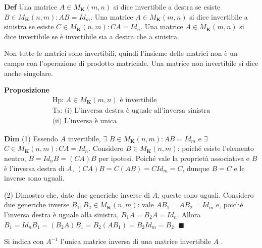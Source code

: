 \documentclass{article}
\begin{document}
\textbf{Def} Una matrice $A\in M_{\mathbf{K}}\left( m,n\right) $ si dice
invertibile a destra se esiste $B\in M_{\mathbf{K}}\left( n,m\right)
:AB=Id_{m}$. Una matrice $A\in M_{\mathbf{K}}\left( m,n\right) $ si dice
invertibile a sinistra se esiste $C\in M_{\mathbf{K}}\left( n,m\right)
:CA=Id_{n}$. Una matrice $A\in M_{\mathbf{K}}\left( m,n\right) $ si dice
invertibile se \`{e} invertibile sia a destra che a sinistra.

Non tutte le matrici sono invertibili, quindi l'insieme delle matrici non 
\`{e} un campo con l'operazione di prodotto matriciale. Una matrice non
invertibile si dice anche singolare.

\textbf{Proposizione}%
\begin{gather*}
\text{Hp}\text{: }A\in M_{\mathbf{K}}\left( m,n\right) \text{ \`{e}
invertibile} \\
\text{Ts}\text{:}\text{ (i) L'inversa destra \`{e} uguale all'inversa
sinistra} \\
\text{(ii) L'inversa \`{e} unica}
\end{gather*}

\textbf{Dim} (1) Essendo $A$ invertibile, $\exists $ $B\in M_{\mathbf{K}%
}\left( n,m\right) :AB=Id_{m}$ e $\exists $ $C\in M_{\mathbf{K}}\left(
n,m\right) :CA=Id_{n}$. Considero $B\in M_{\mathbf{K}}\left( n,m\right) $:
poich\'{e} esiste l'elemento neutro, $B=Id_{n}B=\left( CA\right) B$ per
ipotesi. Poich\'{e} vale la propriet\`{a} associativa e $B$ \`{e} l'inversa
destra di $A$, $\left( CA\right) B=C\left( AB\right) =CId_{m}=C$, dunque $%
B=C $ e le inverse sono uguali.

(2) Dimostro che, date due generiche inverse di $A$, queste sono uguali.
Considero due generiche inverse $B_{1},B_{2}\in M_{\mathbf{K}}\left(
n,m\right) $: vale $AB_{1}=AB_{2}=Id_{m}$ e, poich\'{e} l'inversa destra 
\`{e} uguale alla sinistra, $B_{1}A=B_{2}A=Id_{n}$. Allora $%
B_{1}=Id_{n}B_{1}=\left( B_{2}A\right) B_{1}=B_{2}\left( AB_{1}\right)
=B_{2}Id_{m}=B_{2}$. $\blacksquare $

Si indica con $A^{-1}$ l'unica matrice inversa di una matrice invertibile $A$%
.
\end{document}
